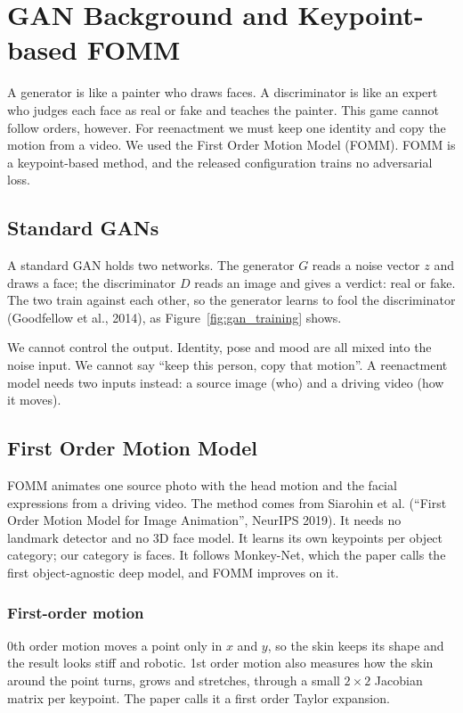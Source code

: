 
\section{GAN Background and Keypoint-based FOMM}

A generator is like a painter who draws faces. A discriminator is like an expert
who judges each face as real or fake and teaches the painter. This game cannot
follow orders, however. For reenactment we must keep one identity and copy the
motion from a video. We used the First Order Motion Model (FOMM). FOMM is a
keypoint-based method, and the released configuration trains no adversarial
loss.

\subsection{Standard GANs}
A standard GAN holds two networks. The generator $G$ reads a noise vector $z$
and draws a face; the discriminator $D$ reads an image and gives a verdict: real
or fake. The two train against each other, so the generator learns to fool the
discriminator (Goodfellow et al., 2014), as Figure~\ref{fig:gan_training} shows.

We cannot control the output. Identity, pose and mood are all mixed into the
noise input. We cannot say ``keep this person, copy that motion''. A
reenactment model needs two inputs instead: a source image (who) and a driving
video (how it moves).



\subsection{First Order Motion Model}
FOMM animates one source photo with the head motion and the facial expressions
from a driving video. The method comes from Siarohin et al. (``First Order
Motion Model for Image Animation'', NeurIPS 2019). It needs no landmark detector
and no 3D face model.
It learns its own keypoints per object category; our category is faces. It
follows Monkey-Net, which the paper calls the first object-agnostic deep model,
and FOMM improves on it.

\subsubsection{First-order motion}
0th order motion moves a point only in $x$ and $y$, so the skin keeps its
shape and the result looks stiff and robotic. 1st order motion also measures how
the skin around the point turns, grows and stretches, through a small
$2\times2$ Jacobian matrix per keypoint. The paper calls it a first order Taylor
expansion.

